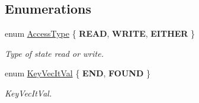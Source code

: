 \subsection*{Enumerations}
\begin{DoxyCompactItemize}
\item 
\mbox{\label{namespaceilang_ab4dc990a0af528177f6f90b63bd208c7}} 
enum \mbox{\hyperlink{namespaceilang_ab4dc990a0af528177f6f90b63bd208c7}{Access\+Type}} \{ {\bfseries R\+E\+AD}, 
{\bfseries W\+R\+I\+TE}, 
{\bfseries E\+I\+T\+H\+ER}
 \}
\begin{DoxyCompactList}\small\item\em Type of state read or write. \end{DoxyCompactList}\item 
\mbox{\label{namespaceilang_aeb374202f0c669bea0a49b87d8dee143}} 
enum \mbox{\hyperlink{namespaceilang_aeb374202f0c669bea0a49b87d8dee143}{Key\+Vec\+It\+Val}} \{ {\bfseries E\+ND}, 
{\bfseries F\+O\+U\+ND}
 \}
\begin{DoxyCompactList}\small\item\em Key\+Vec\+It\+Val. \end{DoxyCompactList}\end{DoxyCompactItemize}
